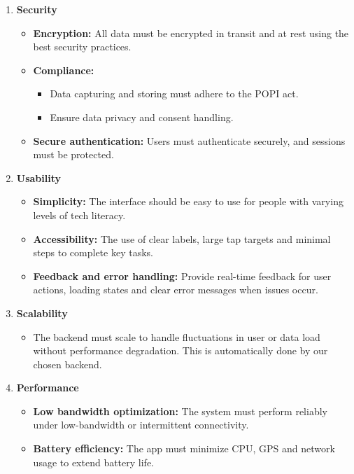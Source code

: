 \documentclass[a4paper,12pt]{article}
\begin{document}
\begin{enumerate}
    \item \textbf{Security}
    \begin{itemize}
        \item \textbf{Encryption:} All data must be encrypted in transit and at rest using the best security practices.
        \item \textbf{Compliance:}
        \begin{itemize}
            \item Data capturing and storing must adhere to the POPI act.
            \item Ensure data privacy and consent handling.
        \end{itemize}
        \item \textbf{Secure authentication:} Users must authenticate securely, and sessions must be protected.
    \end{itemize}

    \item \textbf{Usability}
    \begin{itemize}
        \item \textbf{Simplicity:} The interface should be easy to use for people with varying levels of tech literacy.
        \item \textbf{Accessibility:} The use of clear labels, large tap targets and minimal steps to complete key tasks.
        \item \textbf{Feedback and error handling:} Provide real-time feedback for user actions, loading states and clear error messages when issues occur.
    \end{itemize}

    \item \textbf{Scalability}
    \begin{itemize}
        \item The backend must scale to handle fluctuations in user or data load without performance degradation. This is automatically done by our chosen backend.
    \end{itemize}

    \item \textbf{Performance}
    \begin{itemize}
        \item \textbf{Low bandwidth optimization:} The system must perform reliably under low-bandwidth or intermittent connectivity.
        \item \textbf{Battery efficiency:} The app must minimize CPU, GPS and network usage to extend battery life.
    \end{itemize}


\end{enumerate}
\end{document}

